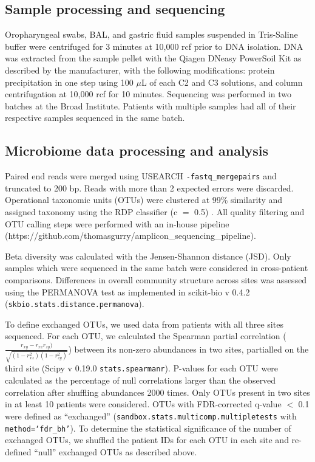 \subsection{Sample processing and sequencing}

Oropharyngeal swabs, BAL, and gastric fluid samples suspended in Tris-Saline buffer were centrifuged for 3 minutes at 10,000 rcf prior to DNA isolation.
DNA was extracted from the sample pellet with the Qiagen DNeasy PowerSoil Kit as described by the manufacturer, with the following modifications: protein precipitation in one step using 100 $\mu$L of each C2 and C3 solutions, and column centrifugation at 10,000 rcf for 10 minutes.
Sequencing was performed in two batches at the Broad Institute.
Patients with multiple samples had all of their respective samples sequenced in the same batch.

\subsection{Microbiome data processing and analysis}

Paired end reads were merged using USEARCH \texttt{-fastq\_mergepairs} and truncated to 200 bp.
Reads with more than 2 expected errors were discarded.
Operational taxonomic units (OTUs) were clustered at 99\% similarity and assigned taxonomy using the RDP classifier (c $=$ 0.5) \cite{wang2007rdp}.
All quality filtering and OTU calling steps were performed with an in-house pipeline \\ (https://github.com/thomasgurry/amplicon\_sequencing\_pipeline).

Beta diversity was calculated with the Jensen-Shannon distance (JSD).
Only samples which were sequenced in the same batch were considered in cross-patient comparisons.
Differences in overall community structure across sites was assessed using the PERMANOVA test as implemented in scikit-bio v 0.4.2 (\texttt{skbio.stats.distance.permanova}).

To define exchanged OTUs, we used data from patients with all three sites sequenced.
For each OTU, we calculated the Spearman partial correlation ($\frac{r_{xy} - r_{xz}r_{zy})}{\sqrt{(1 - r_{xz}^2)(1 - r_{zy}^2)}}$) between its non-zero abundances in two sites, partialled on the third site (Scipy v 0.19.0 \texttt{stats.spearmanr}).
P-values for each OTU were calculated as the percentage of null correlations larger than the observed correlation after shuffling abundances 2000 times.
Only OTUs present in two sites in at least 10 patients were considered.
OTUs with FDR-corrected q-value $<$ 0.1 were defined as ``exchanged'' (\texttt{sandbox.stats.multicomp.multipletests} with \texttt{method=`fdr\_bh'}).
To determine the statistical significance of the number of exchanged OTUs, we shuffled the patient IDs for each OTU in each site and re-defined ``null'' exchanged OTUs as described above.

